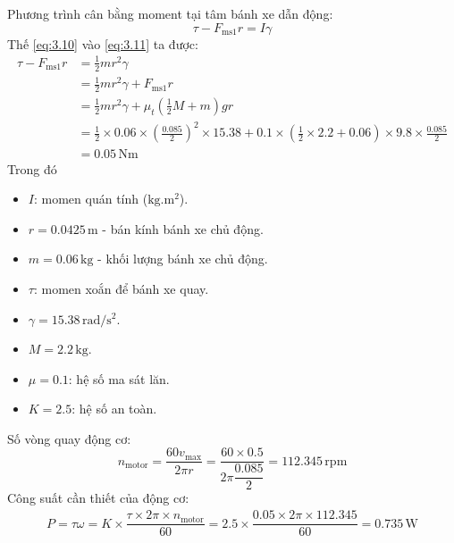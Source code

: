         \hspace*{0.6cm}Phương trình cân bằng moment tại tâm bánh xe dẫn động:
        \begin{equation}
            \tau - F_{\text{ms1}} r = I \gamma
            \label{eq:3.11}
        \end{equation}
        \hspace*{0.6cm}Thế \ref{eq:3.10} vào \ref{eq:3.11} ta được:
        \begin{align*}
            \tau - F_{\text{ms1}} r &= \frac{1}{2}mr^2\gamma \\
            &= \frac{1}{2}mr^2\gamma + F_{\text{ms1}}r \\
            &= \frac{1}{2}mr^2\gamma + \mu_t\left(\frac{1}{2}M + m\right)gr \\
            &= \frac{1}{2} \times 0.06 \times \left(\frac{0.085}{2}\right)^2 \times 15.38 + 0.1 \times \left(\frac{1}{2} \times 2.2 + 0.06\right) \times 9.8 \times \frac{0.085}{2} \\
            &= 0.05 \,\text{Nm}
        \end{align*}
        \hspace*{0.6cm}Trong đó
        \begin{itemize}
            \item $I$: momen quán tính ($\mathrm{kg.m^2}$).
            \item $r = 0.0425 \,\mathrm{m}$ - bán kính bánh xe chủ động.
            \item $m = 0.06 \,\mathrm{kg}$ - khối lượng bánh xe chủ động.
            \item $\tau$: momen xoắn để bánh xe quay.
            \item $\gamma = 15.38 \,\mathrm{rad/s^2}$.
            \item $M = 2.2 \,\mathrm{kg}$.
            \item $\mu = 0.1$: hệ số ma sát lăn.
            \item $K = 2.5$: hệ số an toàn.
        \end{itemize}
        \hspace*{0.6cm}Số vòng quay động cơ:
        \begin{equation*}
            n_{\text{motor}} = \dfrac{60v_{\text{max}}}{2\pi r} = \dfrac{60 \times 0.5}{2 \pi \dfrac{0.085}{2}} = 112.345 \,\mathrm{rpm}
        \end{equation*}
        \hspace*{0.6cm}Công suất cần thiết của động cơ:
        \begin{align*}
            P = \tau \omega = K \times \dfrac{\tau \times 2 \pi \times n_{\text{motor}}}{60} = 2.5 \times \dfrac{0.05 \times 2 \pi \times 112.345}{60} = 0.735 \,\mathrm{W}
        \end{align*}
